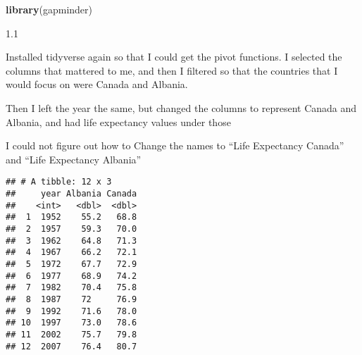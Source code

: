 \documentclass[]{article}
\newenvironment{Shaded}{\begin{snugshade}}{\end{snugshade}}
\newcommand{\KeywordTok}[1]{\textcolor[rgb]{0.13,0.29,0.53}{\textbf{#1}}}
\newcommand{\DataTypeTok}[1]{\textcolor[rgb]{0.13,0.29,0.53}{#1}}
\newcommand{\StringTok}[1]{\textcolor[rgb]{0.31,0.60,0.02}{#1}}
\newcommand{\OperatorTok}[1]{\textcolor[rgb]{0.81,0.36,0.00}{\textbf{#1}}}
\newcommand{\NormalTok}[1]{#1}
\begin{document}
\begin{Shaded}
\begin{Highlighting}[]
\KeywordTok{library}\NormalTok{(gapminder)}
\end{Highlighting}
\end{Shaded}

1.1

Installed tidyverse again so that I could get the pivot functions. I
selected the columns that mattered to me, and then I filtered so that
the countries that I would focus on were Canada and Albania.

Then I left the year the same, but changed the columns to represent
Canada and Albania, and had life expectancy values under those

I could not figure out how to Change the names to ``Life Expectancy
Canada'' and ``Life Expectancy Albania''

\begin{Shaded}
\end{Shaded}

\begin{verbatim}
## # A tibble: 12 x 3
##     year Albania Canada
##    <int>   <dbl>  <dbl>
##  1  1952    55.2   68.8
##  2  1957    59.3   70.0
##  3  1962    64.8   71.3
##  4  1967    66.2   72.1
##  5  1972    67.7   72.9
##  6  1977    68.9   74.2
##  7  1982    70.4   75.8
##  8  1987    72     76.9
##  9  1992    71.6   78.0
## 10  1997    73.0   78.6
## 11  2002    75.7   79.8
## 12  2007    76.4   80.7
\end{verbatim}
\end{document}
